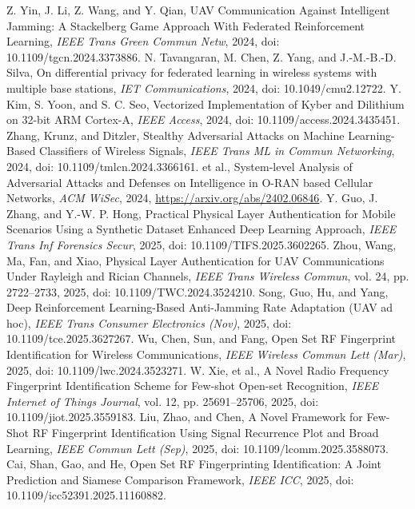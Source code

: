 Z. Yin, J. Li, Z. Wang, and Y. Qian, UAV Communication Against Intelligent Jamming: A Stackelberg Game Approach With Federated Reinforcement Learning, \emph{IEEE Trans Green Commun Netw}, 2024, doi: 10.1109/tgcn.2024.3373886.
N. Tavangaran, M. Chen, Z. Yang, and J.-M.-B.-D. Silva, On differential privacy for federated learning in wireless systems with multiple base stations, \emph{IET Communications}, 2024, doi: 10.1049/cmu2.12722.
Y. Kim, S. Yoon, and S. C. Seo, Vectorized Implementation of Kyber and Dilithium on 32-bit ARM Cortex-A, \emph{IEEE Access}, 2024, doi: 10.1109/access.2024.3435451.
Zhang, Krunz, and Ditzler, Stealthy Adversarial Attacks on Machine Learning-Based Classifiers of Wireless Signals, \emph{IEEE Trans ML in Commun Networking}, 2024, doi: 10.1109/tmlcn.2024.3366161.
et al., System-level Analysis of Adversarial Attacks and Defenses on Intelligence in O-RAN based Cellular Networks, \emph{ACM WiSec}, 2024, \url{https://arxiv.org/abs/2402.06846}.
Y. Guo, J. Zhang, and Y.-W. P. Hong, Practical Physical Layer Authentication for Mobile Scenarios Using a Synthetic Dataset Enhanced Deep Learning Approach, \emph{IEEE Trans Inf Forensics Secur}, 2025, doi: 10.1109/TIFS.2025.3602265.
Zhou, Wang, Ma, Fan, and Xiao, Physical Layer Authentication for UAV Communications Under Rayleigh and Rician Channels, \emph{IEEE Trans Wireless Commun}, vol. 24, pp. 2722--2733, 2025, doi: 10.1109/TWC.2024.3524210.
Song, Guo, Hu, and Yang, Deep Reinforcement Learning-Based Anti-Jamming Rate Adaptation (UAV ad hoc), \emph{IEEE Trans Consumer Electronics (Nov)}, 2025, doi: 10.1109/tce.2025.3627267.
Wu, Chen, Sun, and Fang, Open Set RF Fingerprint Identification for Wireless Communications, \emph{IEEE Wireless Commun Lett (Mar)}, 2025, doi: 10.1109/lwc.2024.3523271.
W. Xie, et al., A Novel Radio Frequency Fingerprint Identification Scheme for Few-shot Open-set Recognition, \emph{IEEE Internet of Things Journal}, vol. 12, pp. 25691--25706, 2025, doi: 10.1109/jiot.2025.3559183.
Liu, Zhao, and Chen, A Novel Framework for Few-Shot RF Fingerprint Identification Using Signal Recurrence Plot and Broad Learning, \emph{IEEE Commun Lett (Sep)}, 2025, doi: 10.1109/lcomm.2025.3588073.
Cai, Shan, Gao, and He, Open Set RF Fingerprinting Identification: A Joint Prediction and Siamese Comparison Framework, \emph{IEEE ICC}, 2025, doi: 10.1109/icc52391.2025.11160882.

